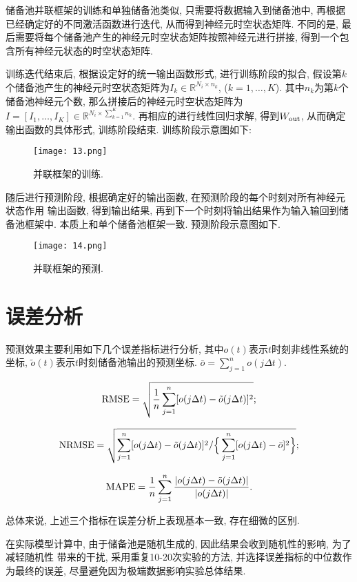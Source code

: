 \documentclass[notitlepage,cs4size,punct,oneside]{ctexrep}
\numberwithin{equation}{chapter}
\theoremstyle{mystyle}
\begin{document}
储备池并联框架的训练和单独储备池类似, 只需要将数据输入到储备池中, 
再根据已经确定好的不同激活函数进行迭代, 从而得到神经元时空状态矩阵. 
不同的是, 最后需要将每个储备池产生的神经元时空状态矩阵按照神经元进行拼接, 
得到一个包含所有神经元状态的时空状态矩阵. 

训练迭代结束后, 根据设定好的统一输出函数形式, 进行训练阶段的拟合, 
假设第$k$个储备池产生的神经元时空状态矩阵为$I_k\in\mathbb{R}^{{N_i}\times{n_k}}$, 
($k=1, \dots, K$).
其中$n_k$为第$k$个储备池神经元个数, 那么拼接后的神经元时空状态矩阵为
$I=[I_1, \dots, I_K]\in\mathbb{R}^{{N_i}\times{\sum_{k=1}^Kn_k}}$. 
再相应的进行线性回归求解, 得到$W_{\textmd{out}}$, 
从而确定输出函数的具体形式, 训练阶段结束. 训练阶段示意图如下:

\begin{figure}[htbp]
    \centering
    \texttt{[image: 13.png]}
    \caption{并联框架的训练.}
\end{figure}

随后进行预测阶段, 根据确定好的输出函数, 在预测阶段的每个时刻对所有神经元状态作用
输出函数, 得到输出结果, 再到下一个时刻将输出结果作为输入输回到储备池框架中. 
本质上和单个储备池框架一致. 预测阶段示意图如下.

\begin{figure}[htbp]
    \centering
    \texttt{[image: 14.png]}
    \caption{并联框架的预测.}
\end{figure}

\section{误差分析}

预测效果主要利用如下几个误差指标进行分析, 其中$o(t)$表示$t$时刻非线性系统的坐标, 
$\tilde{o}(t)$表示$t$时刻储备池输出的预测坐标. $\bar{o}=\sum_{j=1}^no(j\Delta t)$. 

$$
    \textmd{RMSE} = \sqrt{\frac{1}{n}\sum_{j=1}^n[o(j\Delta t)-\tilde{o}(j\Delta t)]^2};
$$

$$
    \textmd{NRMSE} = \sqrt{\sum_{j=1}^n[o(j\Delta t)-\tilde{o}(j\Delta t)]^2 / 
    \Big\{\sum_{j=1}^n[o(j\Delta t)-\bar{o}]^2\Big\}};
$$

$$
    \textmd{MAPE} = \frac{1}{n}\sum_{j=1}^n\frac{|o(j\Delta t)-\tilde{o}(j\Delta t)|}{|o(j\Delta t)|}. 
$$

总体来说, 上述三个指标在误差分析上表现基本一致, 存在细微的区别. 

在实际模型计算中, 由于储备池是随机生成的, 因此结果会收到随机性的影响, 为了减轻随机性
带来的干扰, 采用重复10-20次实验的方法, 并选择误差指标的中位数作为最终的误差, 
尽量避免因为极端数据影响实验总体结果. 
\end{document}
